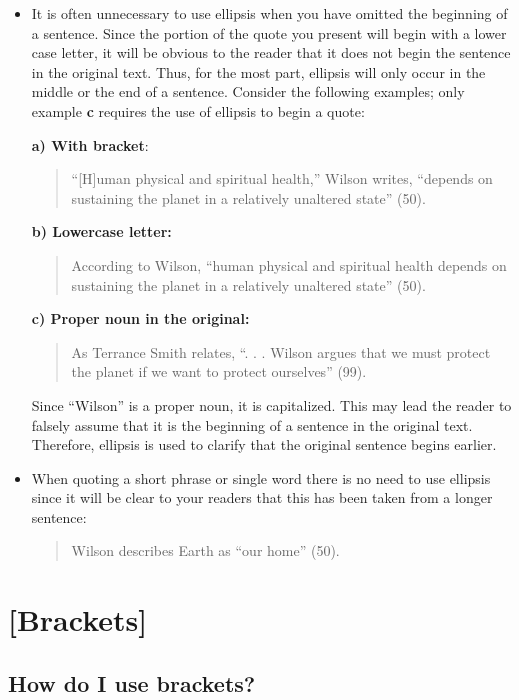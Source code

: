 \begin{itemize} \item{}

It is often unnecessary to use ellipsis when you have omitted the beginning of a
sentence. Since the portion of the quote you present will begin with a lower
case letter, it will be obvious to the reader that it does not begin the
sentence in the original text. Thus, for the most part, ellipsis will only occur
in the middle or the end of a sentence. Consider the following examples; only
example \textbf{c} requires the use of ellipsis to begin a quote:

\textbf{a) With bracket}:  \begin{quote}“[H]uman physical and spiritual health,”
Wilson writes, “depends on sustaining the planet in a relatively unaltered
state” (50).\end{quote}

\textbf{b) Lowercase letter:} \begin{quote}According to Wilson, “human physical
and spiritual health depends on sustaining the planet in a relatively unaltered
state” (50).\end{quote}

\textbf{c) Proper noun in the original:} \begin{quote}As Terrance Smith relates, “. . .
Wilson argues that we must protect the planet if we want to protect ourselves”
(99).\end{quote}

Since “Wilson” is a proper noun, it is capitalized. This may lead the reader to falsely assume that it is the beginning of a sentence in the original text. Therefore, ellipsis is used to clarify that the original sentence begins earlier.

\item {}

When quoting a short phrase or single word there is no need to use ellipsis
since it will be clear to your readers that this has been taken from a longer
sentence:

\begin{quote} Wilson describes Earth as “our home” (50).\end{quote}

\end{itemize}

\hypertarget{brackets}{}
\section{[Brackets]} \subsection{How do I use brackets?}

